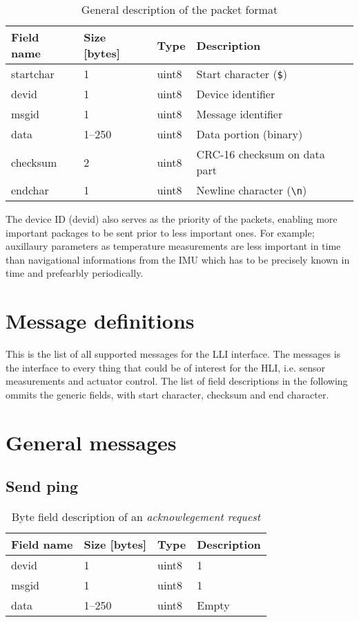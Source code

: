 \begin{table}[htbp]
	\centering
	\begin{tabular}{llll}
		\toprule
		\textbf{Field name} & \textbf{Size [bytes]} & \textbf{Type} & \textbf{Description}\\
		\midrule
		startchar & 1 & uint8 & Start character (\texttt{\$}) \\
		devid & 1 & uint8 & Device identifier \\
		msgid & 1 & uint8 & Message identifier \\
		data & 1--250 & uint8 & Data portion (binary)\\
		checksum & 2 & uint8 & CRC-16 checksum on data part \\
		endchar & 1 & uint8 & Newline character (\texttt{\textbackslash n})\\
		\bottomrule
	\end{tabular}
	\caption{General description of the packet format}
	\label{tab:general}
\end{table}

The device ID (devid) also serves as the priority of the packets, enabling more important packages to be sent prior to less important ones. For example; auxillaury parameters as temperature measurements are less important in time than navigational informations from the \ac{IMU} which has to be precisely known in time and prefearbly periodically.

\section{Message definitions}
This is the list of all supported messages for the LLI interface. The messages is the interface to every thing that could be of interest for the HLI, i.e. sensor measurements and actuator control. The list of field descriptions in the following ommits the generic fields, with start character, checksum and end character.

\section{General messages}

\subsection{Send ping}
\begin{table}[h]
	\centering
	\begin{tabular}{llll}
		\toprule
		\textbf{Field name} & \textbf{Size [bytes]} & \textbf{Type} & \textbf{Description}\\
		\midrule
		devid & 1 & uint8 & 1 \\
		msgid & 1 & uint8 & 1 \\
		data & 1--250 & uint8 & Empty\\
		\bottomrule
	\end{tabular}
	\caption{Byte field description of an \textit{acknowlegement request}}
	\label{tab:ack}
\end{table}

